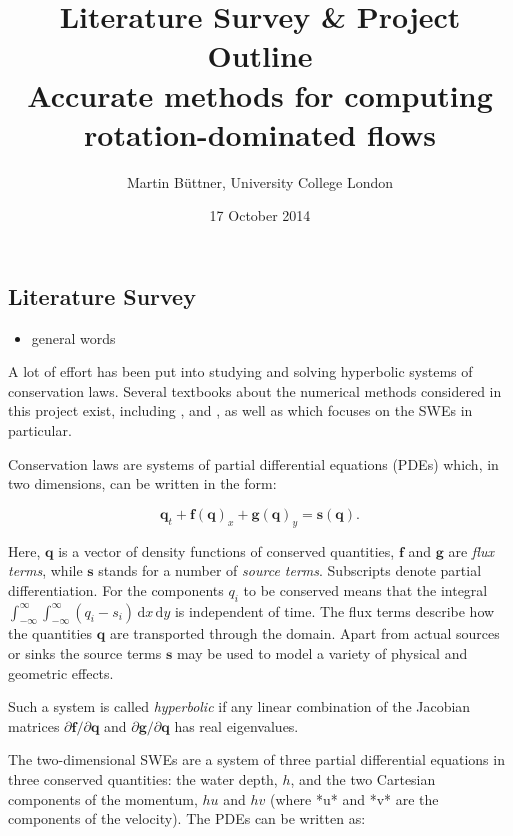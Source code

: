 \documentclass[a4paper,onecolumn,11pt]{article}
\title{Literature Survey \& Project Outline\\\small Accurate methods for computing rotation-dominated flows}
\author{Martin Büttner, University College London}
\date{17 October 2014}
\renewcommand{\vec}[1]{\ensuremath{\mathbf{#1}}}
\newcommand{\dif}{\mathrm{d}}
\newcounter{word}
\begin{document}
\maketitle

\begin{assignment}

\section*{Literature Survey}

\begin{itemize}
    \item general words
\end{itemize}

A lot of effort has been put into studying and solving hyperbolic systems of conservation laws. Several textbooks about the numerical methods considered in this project exist, including \citet{leveque1992numerical}, \citet{toro1999riemann} and \citet{leveque2002finite}, as well as \citet{toro2001shock} which focuses on the SWEs in particular.

Conservation laws are systems of partial differential equations (PDEs) which, in two dimensions, can be written in the form:

\begin{equation}
    \vec{q}_t + \vec{f}(\vec{q})_x + \vec{g}(\vec{q})_y = \vec{s}(\vec{q}).
    \label{claw}
\end{equation}

Here, $\vec{q}$ is a vector of density functions of conserved quantities, $\vec{f}$ and $\vec{g}$ are \emph{flux terms}, while $\vec{s}$ stands for a number of \emph{source terms}. Subscripts denote partial differentiation. For the components $q_i$ to be conserved means that the integral $\int_{-\infty}^\infty\int_{-\infty}^\infty (q_i - s_i)\,\dif x\,\dif y$ is independent of time. The flux terms describe how the quantities $\vec{q}$ are transported through the domain. Apart from actual sources or sinks the source terms $\vec{s}$ may be used to model a variety of physical and geometric effects.

Such a system is called \emph{hyperbolic} if any linear combination of the Jacobian matrices $\partial\vec{f}/\partial\vec{q}$ and $\partial\vec{g}/\partial\vec{q}$ has real eigenvalues.

The two-dimensional SWEs are a system of three partial differential equations in three conserved quantities: the water depth, $h$, and the two Cartesian components of the momentum, $hu$ and $hv$ (where *u* and *v* are the components of the velocity). The PDEs can be written as:


\end{assignment}
\end{document}

